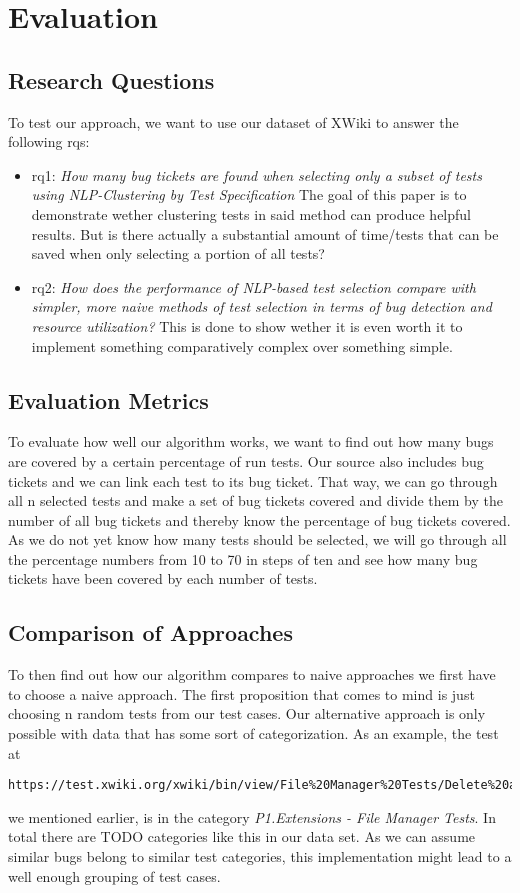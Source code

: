 \section{Evaluation}
\subsection{Research Questions}
To test our approach, we want to use our dataset of XWiki to answer the
following \acp{rq}:
\begin{itemize}
    \item \ac{rq}1: \emph{How many bug tickets are found when selecting only a subset of tests using NLP-Clustering by Test Specification}
          The goal of this paper is to demonstrate wether clustering tests in said method can produce helpful results. But is there actually a substantial amount of time/tests that can be saved when only selecting a portion of all tests?
    \item \ac{rq}2: \emph{How does the performance of NLP-based test selection compare with simpler, more naive methods of test selection in terms of bug detection and resource utilization?} This is done to show wether it is even worth it to implement something comparatively complex over something simple.
\end{itemize}

\subsection{Evaluation Metrics}
To evaluate how well our algorithm works, we want to find out how many bugs are
covered by a certain percentage of run tests. Our source also includes bug
tickets and we can link each test to its bug ticket. That way, we can go
through all n selected tests and make a set of bug tickets covered and divide
them by the number of all bug tickets and thereby know the percentage of bug
tickets covered. As we do not yet know how many tests should be selected, we
will go through all the percentage numbers from 10 to 70 in steps of ten and
see how many bug tickets have been covered by each number of tests.

\subsection{Comparison of Approaches}
To then find out how our algorithm compares to naive approaches we first have
to choose a naive approach. The first proposition that comes to mind is just
choosing n random tests from our test cases. Our alternative approach is only
possible with data that has some sort of categorization. As an example, the
test at
\begin{verbatim}
https://test.xwiki.org/xwiki/bin/view/File%20Manager%20Tests/Delete%20a%20file
\end{verbatim}
we mentioned earlier, is in the category \emph{P1.Extensions - File Manager
    Tests}. In total there are TODO categories like this in our data set. As we can
assume similar bugs belong to similar test categories, this implementation
might lead to a well enough grouping of test cases.

